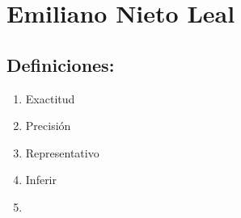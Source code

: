 \section{Emiliano Nieto Leal}
\subsection{Definiciones:}

\begin{enumerate}
    \item Exactitud
    \item Precisión
    \item Representativo
    \item Inferir
    \item 
\end{enumerate}

\newpage



